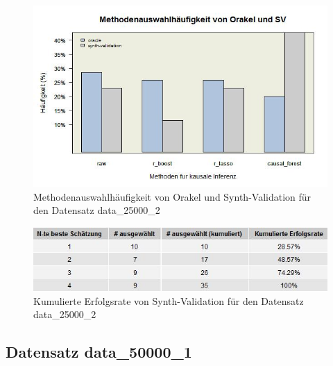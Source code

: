 \documentclass[12pt,a4paper,twoside]{scrartcl}
\numberwithin{equation}{section}
\newcounter{mypagecount}%
\newenvironment{interlude}{%
  \clearpage
  \setcounter{mypagecount}{\value{page}}%
  \thispagestyle{empty}%
  \pagestyle{empty}%
}{%
  \clearpage
  \setcounter{page}{\value{mypagecount}}%
}
\begin{document}
\begin{interlude}
\begin{appendices}
\begin{center}
\begin{figure}[H]
    \centering
    \includegraphics[height=0.5\textwidth, width=1\textwidth]{figures/plots/appendix/rawData25000bBarplot.jpeg}
    \caption[Methodenauswahlhäufigkeit von Orakel und Synth-Validation für den Datensatz data\_25000\_2]{Methodenauswahlhäufigkeit von Orakel und Synth-Validation für den Datensatz data\_25000\_2}
  \end{figure}
\end{center}

\begin{center}
\begin{figure}[H]
    \centering
    \includegraphics[height=0.2\textwidth, width=1\textwidth]{figures/plots/appendix/rawData25000bGrid.jpeg}
    \vspace{1mm}
    \caption[Kumulierte Erfolgsrate von Synth-Validation für den Datensatz data\_25000\_2]{Kumulierte Erfolgsrate von Synth-Validation für den Datensatz data\_25000\_2}
  \end{figure}
\end{center}

\subsection{Datensatz data\_50000\_1}


\end{appendices}
\end{interlude}
\end{document}
